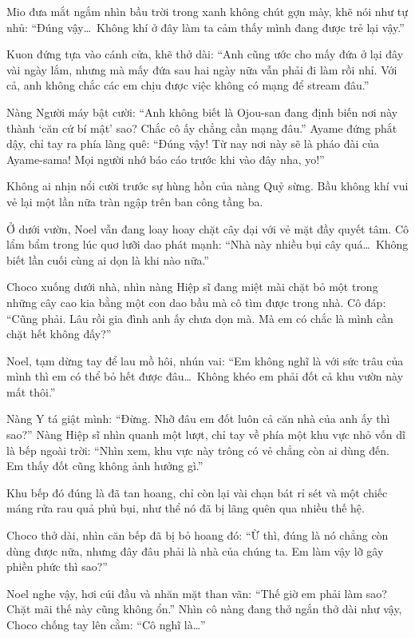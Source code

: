 \documentclass[../main.tex]{subfiles}
\begin{document}
Mio đưa mắt ngắm nhìn bầu trời trong xanh không chút gợn mày, khẽ nói như tự nhủ: ``Đúng vậy\dots\ Không khí ở đây làm ta cảm thấy mình đang được trẻ lại vậy.''

Kuon đứng tựa vào cánh cửa, khẽ thở dài: ``Anh cũng ước cho mấy đứa ở lại đây vài ngày lắm, nhưng mà mấy đứa sau hai ngày nữa vẫn phải đi làm rồi nhỉ. Với cả, anh không chắc các em chịu được việc không có mạng để stream đâu.''

Nàng Người máy bật cười: ``Anh không biết là Ojou-san đang định biến nơi này thành `căn cứ bí mật' sao? Chắc cô ấy chẳng cần mạng đâu.'' Ayame đứng phắt dậy, chỉ tay ra phía làng quê: ``Đúng vậy! Từ nay nơi này sẽ là pháo đài của Ayame-sama! Mọi người nhớ báo cáo trước khi vào đây nha, yo!''

Không ai nhịn nổi cười trước sự hùng hồn của nàng Quỷ sừng. Bầu không khí vui vẻ lại một lần nữa tràn ngập trên ban công tầng ba.

\ct

Ở dưới vườn, Noel vẫn đang loay hoay chặt cây dại với vẻ mặt đầy quyết tâm. Cô lẩm bẩm trong lúc quơ lưỡi dao phát mạnh: ``Nhà này nhiều bụi cây quá\dots\ Không biết lần cuối cùng ai dọn là khi nào nữa.''

Choco xuống dưới nhà, nhìn nàng Hiệp sĩ đang miệt mài chặt bỏ một trong những cây cao kia bằng một con dao bầu mà cô tìm được trong nhà. Cô đáp: ``Cũng phải. Lâu rồi gia đình anh ấy chưa dọn mà. Mà em có chắc là mình cần chặt hết không đấy?''

Noel, tạm dừng tay để lau mồ hôi, nhún vai: ``Em không nghĩ là với sức trâu của mình thì em có thể bỏ hết được đâu\dots\ Không khéo em phải đốt cả khu vườn này mất thôi.''

Nàng Y tá giật mình: ``Đừng. Nhỡ đâu em đốt luôn cả căn nhà của anh ấy thì sao?'' Nàng Hiệp sĩ nhìn quanh một lượt, chỉ tay về phía một khu vực nhỏ vốn dĩ là bếp ngoài trời: ``Nhìn xem, khu vực này trông có vẻ chẳng còn ai dùng đến. Em thấy đốt cũng không ảnh hưởng gì.''

Khu bếp đó đúng là đã tan hoang, chỉ còn lại vài chạn bát rỉ sét và một chiếc máng rửa rau quả phủ bụi, như thể nó đã bị lãng quên qua nhiều thế hệ.

Choco thở dài, nhìn căn bếp đã bị bỏ hoang đó: ``Ừ thì, đúng là nó chẳng còn dùng được nữa, nhưng đây đâu phải là nhà của chúng ta. Em làm vậy lỡ gây phiền phức thì sao?''

Noel nghe vậy, hơi cúi đầu và nhăn mặt than vãn: ``Thế giờ em phải làm sao? Chặt mãi thế này cũng không ổn.'' Nhìn cô nàng đang thở ngắn thở dài như vậy, Choco chống tay lên cằm: ``Cô nghĩ là\dots''
\end{document}
